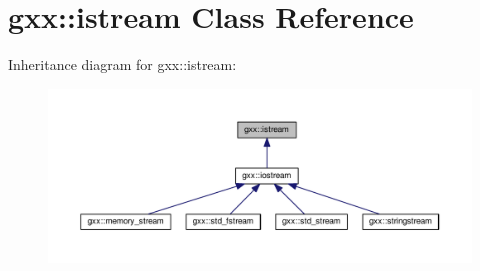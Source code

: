 \hypertarget{classgxx_1_1istream}{}\section{gxx\+:\+:istream Class Reference}
\label{classgxx_1_1istream}


Inheritance diagram for gxx\+:\+:istream\+:
\nopagebreak
\begin{figure}[H]
\begin{center}
\leavevmode
\includegraphics[width=350pt]{classgxx_1_1istream__inherit__graph}
\end{center}
\end{figure}
